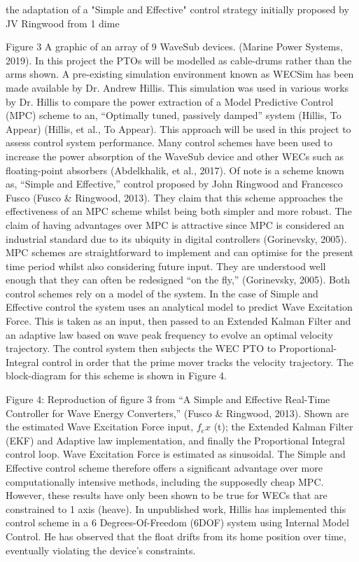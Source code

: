 \documentclass{report}
\begin{document}
 the adaptation of a "Simple and Effective" control strategy initially proposed by JV Ringwood \cite{ringwood} from 1 dime


Figure 3 A graphic of an array of 9 WaveSub devices. (Marine Power Systems, 2019). In this project the PTOs will be modelled as cable-drums rather than the arms shown. A pre-existing simulation environment known as WECSim has been made available by Dr. Andrew Hillis. This simulation was used in various works by Dr. Hillis to compare the power extraction of a Model Predictive Control (MPC) scheme to an, “Optimally tuned, passively damped” system (Hillis, To Appear) (Hillis, et al., To Appear). This approach will be used in this project to assess control system performance. Many control schemes have been used to increase the power absorption of the WaveSub device and other WECs such as floating-point absorbers (Abdelkhalik, et al., 2017). Of note is a scheme known as, “Simple and Effective,” control proposed by John Ringwood and Francesco Fusco (Fusco \& Ringwood, 2013). They claim that this scheme approaches the effectiveness of an MPC scheme whilst being both simpler and more robust. The claim of having advantages over MPC is attractive since MPC is considered an industrial standard due to its ubiquity in digital controllers (Gorinevsky, 2005). MPC schemes are straightforward to implement and can optimise for the present time period whilst also considering future input. They are understood well enough that they can often be redesigned “on the fly,” (Gorinevsky, 2005). Both control schemes rely on a model of the system. In the case of Simple and Effective control the system uses an analytical model to predict Wave Excitation Force. This is taken as an input, then passed to an Extended Kalman Filter and an adaptive law based on wave peak frequency to evolve an optimal velocity trajectory. The control system then subjects the WEC PTO to Proportional-Integral control in order that the prime mover tracks the velocity trajectory. The block-diagram for this scheme is shown in Figure 4. 

Figure 4: Reproduction of figure 3 from “A Simple and Effective Real-Time Controller for Wave Energy Converters,” (Fusco \& Ringwood, 2013). Shown are the estimated Wave Excitation Force input, $f_ex$ (t); the Extended Kalman Filter (EKF) and Adaptive law implementation, and finally the Proportional Integral control loop. Wave Excitation Force is estimated as sinusoidal. The Simple and Effective control scheme therefore offers a significant advantage over more computationally intensive methods, including the supposedly cheap MPC. However, these results have only been shown to be true for WECs that are constrained to 1 axis (heave). In unpublished work, Hillis has implemented this control scheme in a 6 Degrees-Of-Freedom (6DOF) system using Internal Model Control. He has observed that the float drifts from its home position over time, eventually violating the device’s constraints. 
\end{document}
